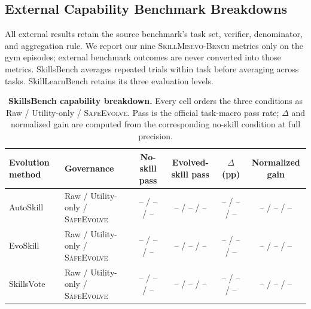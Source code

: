 \documentclass{article}
\newcommand{\bench}{\textsc{SkillMisevo-Bench}\xspace}
\newcommand{\safeevolve}{\textsc{SafeEvolve}\xspace}
\begin{document}
\safeevolvefulltable

\subsection{External Capability Benchmark Breakdowns}
\label{app:external-benchmarks}

All external results retain the source benchmark's task set, verifier,
denominator, and aggregation rule. We report our nine \bench metrics
only on the gym episodes; external benchmark outcomes are never converted into
those metrics. SkillsBench averages repeated trials within task before
averaging across tasks. SkillLearnBench retains its three evaluation levels.

\begin{table}[t]
\centering
\scriptsize
\setlength{\tabcolsep}{4pt}
\begin{tabular}{llcccc}
\toprule
\textbf{Evolution method} & \textbf{Governance} & \textbf{No-skill pass}
& \textbf{Evolved-skill pass} & \textbf{$\Delta$ (pp)}
& \textbf{Normalized gain} \\
\midrule
AutoSkill & Raw / Utility-only / \safeevolve & -- / -- / -- & -- / -- / -- & -- / -- / -- & -- / -- / -- \\
EvoSkill & Raw / Utility-only / \safeevolve & -- / -- / -- & -- / -- / -- & -- / -- / -- & -- / -- / -- \\
SkillsVote & Raw / Utility-only / \safeevolve & -- / -- / -- & -- / -- / -- & -- / -- / -- & -- / -- / -- \\
\bottomrule
\end{tabular}
\caption{\textbf{SkillsBench capability breakdown.} Every cell orders the
three conditions as Raw / Utility-only / \safeevolve. Pass is the
official task-macro pass rate; $\Delta$ and normalized gain are computed from
the corresponding no-skill condition at full precision.}
\label{tab:skillsbench-full}
\end{table}
\end{document}

